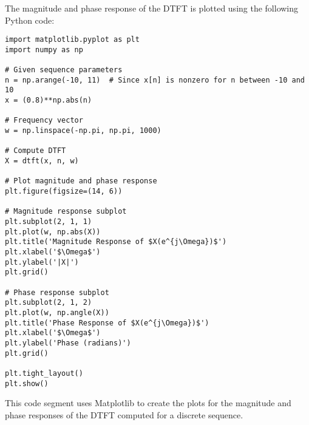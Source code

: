 
\item[(b)]
The magnitude and phase response of the DTFT is plotted using the following Python code:

\begin{verbatim}
import matplotlib.pyplot as plt
import numpy as np

# Given sequence parameters
n = np.arange(-10, 11)  # Since x[n] is nonzero for n between -10 and 10
x = (0.8)**np.abs(n)

# Frequency vector
w = np.linspace(-np.pi, np.pi, 1000)

# Compute DTFT
X = dtft(x, n, w)

# Plot magnitude and phase response
plt.figure(figsize=(14, 6))

# Magnitude response subplot
plt.subplot(2, 1, 1)
plt.plot(w, np.abs(X))
plt.title('Magnitude Response of $X(e^{j\Omega})$')
plt.xlabel('$\Omega$')
plt.ylabel('|X|')
plt.grid()

# Phase response subplot
plt.subplot(2, 1, 2)
plt.plot(w, np.angle(X))
plt.title('Phase Response of $X(e^{j\Omega})$')
plt.xlabel('$\Omega$')
plt.ylabel('Phase (radians)')
plt.grid()

plt.tight_layout()
plt.show()
\end{verbatim}

This code segment uses Matplotlib to create the plots for the magnitude and phase responses
of the DTFT computed for a discrete sequence.
